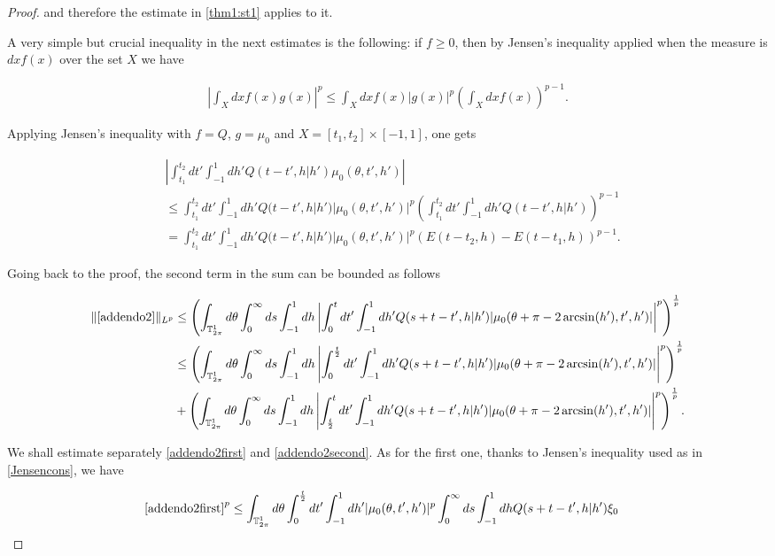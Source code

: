 \documentclass[a4paper,10pt,reqno]{amsart}
\numberwithin{equation}{subsection}
\numberwithin{figure}{subsection}
\begin{document}
\begin{proof}
and therefore the estimate in \eqref{thm1:st1} applies to it.

A very simple but crucial inequality in the next estimates is the following: if $f\geq0$, then by Jensen's inequality applied when the measure is $dxf(x)$ over the set $X$ we have

\begin{align*}
\left|\int_{X}dxf(x)g(x)\right|^p\leq\int_{X}dxf(x)|g(x)|^p\left(\int_{X}dxf(x)\right)^{p-1}.
\end{align*}

Applying Jensen's inequality with $f=Q$, $g=\mu_0$ and $X=[t_1,t_2]\times[-1,1]$, one gets

{\small\begin{align}
\nonumber&\left|\int_{t_1}^{t_2}dt'\int_{-1}^1dh'Q(t-t',h|h')\mu_0(\theta,t',h')\right|
\\
\nonumber&\leq\int_{t_1}^{t_2}dt'\int_{-1}^1dh'Q(t-t',h|h')|\mu_0(\theta,t',h')|^p\left(\int_{t_1}^{t_2}dt'\int_{-1}^1dh'Q(t-t',h|h')\right)^{p-1}
\\
\label{Jensencons}&=\int_{t_1}^{t_2}dt'\int_{-1}^1dh'Q(t-t',h|h')|\mu_0(\theta,t',h')|^p\left(E(t-t_2,h)-E(t-t_1,h)\right)^{p-1}.
\end{align}}

Going back to the proof, the second term in the sum can be bounded as follows

{\tiny\begin{align}
\nonumber\|\eqref{addendo2}\|_{L^p}&\leq\left(\int_{\mathbb{T}^1_{2\pi}}d\theta\int_0^{\infty}ds\int_{-1}^1dh\left|\int_0^tdt'\int_{-1}^1dh'Q(s+t-t',h|h')|\mu_0(\theta+\pi-2\arcsin(h'),t',h')|\right|^p\right)^{\frac{1}{p}}
\\
\label{addendo2first}&\leq\left(\int_{\mathbb{T}^1_{2\pi}}d\theta\int_0^{\infty}ds\int_{-1}^1dh\left|\int_0^{\frac{t}{2}}dt'\int_{-1}^1dh'Q(s+t-t',h|h')|\mu_0(\theta+\pi-2\arcsin(h'),t',h')|\right|^p\right)^{\frac{1}{p}}
\\
\label{addendo2second}&+\left(\int_{\mathbb{T}^1_{2\pi}}d\theta\int_0^{\infty}ds\int_{-1}^1dh\left|\int_{\frac{t}{2}}^tdt'\int_{-1}^1dh'Q(s+t-t',h|h')|\mu_0(\theta+\pi-2\arcsin(h'),t',h')|\right|^p\right)^{\frac{1}{p}}.
\end{align}}

We shall estimate separately \eqref{addendo2first} and \eqref{addendo2second}. As for the first one, thanks to Jensen's inequality used as in \eqref{Jensencons}, we have

{\small\begin{align*}
&\eqref{addendo2first}^p\leq\int_{\mathbb{T}^1_{2\pi}}d\theta\int_0^{\frac{t}{2}}dt'\int_{-1}^1dh'|\mu_0(\theta,t',h')|^p\int_0^{\infty}ds\int_{-1}^1dhQ(s+t-t',h|h')\xi_0
\end{align*}}


\end{proof}
\end{document}
